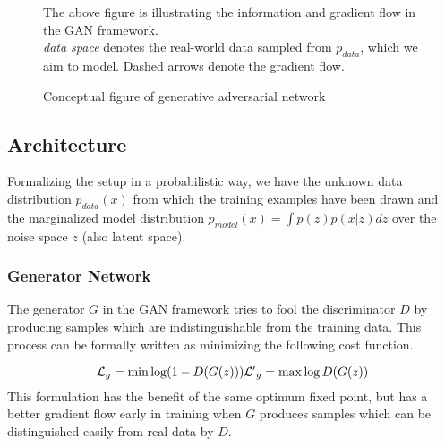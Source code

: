 \begin{figure}[htb]
\centering

  \caption{Conceptual figure of generative adversarial network}
  \label{fig:gan_a}
  \medskip
  \small
  The above figure is illustrating the information and gradient flow in the GAN framework.\\
  \emph{data space} denotes the real-world data sampled from $p_{data}$, which we aim to model.
  Dashed arrows denote the gradient flow.
\end{figure}

\newpage

\subsection{Architecture}
\label{sub:gan_arch}
Formalizing the setup in a probabilistic way, we have the unknown data distribution $p_{data}(x)$ from which the training examples have been drawn and the marginalized model distribution $p_{model}(x) = \int p(z)p(x|z) \textit{d}z$ over the noise space $z$ (also latent space).




%


\subsubsection{Generator Network}
The generator $G$ in the GAN framework tries to fool the discriminator $D$ by producing samples which are indistinguishable from the training data.
This process can be formally written as minimizing the following cost function.

$$
\mathcal{L}_g = \min \log(1 - D(G(z)))\\
\mathcal{L'}_g = \max \log D(G(z))
$$
This formulation has the benefit of the same optimum fixed point, but has a better gradient flow early in training when $G$ produces samples which can be distinguished easily from real data by $D$.

